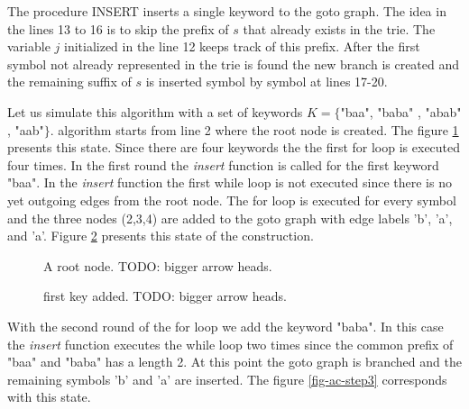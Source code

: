\documentclass[english,twoside,censored,csm,algorithms-track-2020]{HYthesisML}
\theoremstyle{plain}
\theoremstyle{definition}
\begin{document}
  The procedure \textsc{INSERT} inserts a single keyword to the goto graph. The idea in the lines
  13 to 16 is to skip the prefix of $s$ that already exists in the trie. The variable $j$ initialized
  in the line 12 keeps track of this prefix. After the first symbol not already represented in the
  trie is found the new branch is created and the remaining suffix of $s$ is inserted symbol by symbol
  at lines 17-20.

  Let us simulate this algorithm with a set of keywords $K=\{$"baa", "baba" , "abab" , "aab"$\}$.
  algorithm starts from line 2 where the root node is created. The figure \ref{fig-ac-step1}
  presents this state. Since there are four keywords the the first for loop is executed four times.
  In the first round the \textit{insert} function is called for the first keyword "baa".
  In the \textit{insert} function the first while loop is not executed since there is no yet
  outgoing edges from the root node. The for loop is executed for every symbol and the three
  nodes (2,3,4) are added to the goto graph with edge labels 'b', 'a', and 'a'.
  Figure \ref{fig-ac-step2} presents this state of the construction.


  \begin{figure}[h]
  \centering
  \caption{A root node. TODO: bigger arrow heads.} \label{fig-ac-step1}
  \end{figure}

  \begin{figure}[h]
  \centering
  \caption{first key added. TODO: bigger arrow heads.} \label{fig-ac-step2}
\end{figure}

  With the second round of the for loop we add the keyword "baba". In this case the \textit{insert}
  function executes the while loop two times since the common prefix of "baa" and "baba" has a length
  2. At this point the goto graph is branched and the remaining symbols 'b' and 'a' are inserted. The
  figure \ref{fig-ac-step3} corresponds with this state.
\end{document}
